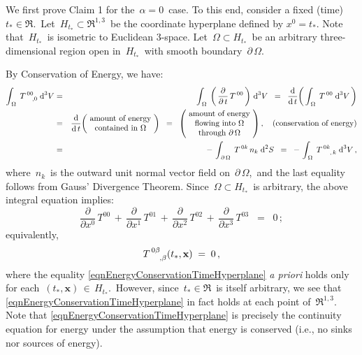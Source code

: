 \vskip 0.2cm
\noindent
We first prove Claim 1 for the \,$\alpha = 0$\, case.
To this end, consider a fixed (time) \,$ t_{*} \in \Re$.\,
Let \,$H_{t_{*}} \subset \Re^{1,3}$\, be the coordinate hyperplane defined by $x^{0} = t_{*}$.
Note that \,$H_{t_{*}}$\, is isometric to Euclidean $3$-space.
Let \,$\Omega \subset H_{t_{*}}$\, be an arbitrary three-dimensional region open in \,$H_{t_{*}}$\, 
with smooth boundary \,$\partial\,\Omega$.\,

\vskip 0.2cm
\noindent
By {\color{red}Conservation of Energy}, we have:
\begin{eqnarray*}
\int_{\,\Omega}\;T^{\,00}_{\,{\color{white}00},0}\;\d^{3}V
& = &
	\int_{\,\Omega}\;\left(\,\dfrac{\partial}{\partial\,t}\,T^{\,00}\,\right)\,\d^{3}V
\;\; = \;\;
	\dfrac{\d}{\d\,t}\!\left(\,\int_{\,\Omega}\;T^{\,00}\;\d^{3}V\,\right)
\\
&=&
\dfrac{\d}{\d\,t}\!\left(\!\begin{array}{c}
	\textnormal{amount of energy}
	\\
	\textnormal{contained in $\Omega$}
	\end{array}\!\right)
\;\; = \;\;
	\left(\!\begin{array}{c}
		\textnormal{amount of energy}
		\\
		\textnormal{flowing into $\Omega$}
		\\
		\textnormal{through $\partial\,\Omega$}
		\end{array}\!\right),
	\quad
	\textnormal{(conservation of energy)}
\\
&=&
	-\,\int_{\,\partial\,\Omega}\;T^{\,0k}\,n_{k}\;\d^{2}S
\;\; = \;\;
	-\,\int_{\,\Omega}\;T^{\,0k}_{\;{\color{white}0k},\,k}\;\d^{3}V\,,
\end{eqnarray*}
where \,$n_{k}$\, is the outward unit normal vector field on \,$\partial\,\Omega$,\,
and the last equality follows from {\color{red}Gauss' Divergence Theorem}.
Since \,$\Omega \subset H_{t_{*}}$\, is arbitrary, the above integral equation implies:
\begin{equation*}
\dfrac{\partial}{\partial x^{0}}\,T^{00}
\,+\,
\dfrac{\partial}{\partial x^{1}}\,T^{01}
\,+\,
\dfrac{\partial}{\partial x^{2}}\,T^{02}
\,+\,
\dfrac{\partial}{\partial x^{3}}\,T^{03}
\;\; = \;\;
0\,;
\end{equation*}
equivalently,
\begin{equation}\label{eqnEnergyConservationTimeHyperplane}
T^{\,0\beta}_{\;{\color{white}0\beta},\beta}(t_{*},\mathbf{x}) \; = \; 0\,,
\end{equation}
where the equality \eqref{eqnEnergyConservationTimeHyperplane}
\textit{a priori} holds only for each \,$(t_{*},\mathbf{x}) \,\in\, H_{t_{*}}$.\,
However, since \,$t_{*} \in \Re$\, is itself arbitrary, we see that 
\eqref{eqnEnergyConservationTimeHyperplane} in fact holds at each point of \,$\Re^{1,3}$.\,
Note that \eqref{eqnEnergyConservationTimeHyperplane} is precisely
the {\color{red}continuity equation for energy} under the assumption that energy is conserved
(i.e., no sinks nor sources of energy).


